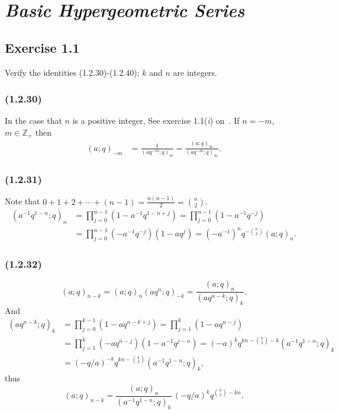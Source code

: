 \clearpage


\section*{\emph{Basic Hypergeometric Series}}\label{sec:bhs}

\subsection*{Exercise 1.1}\label{subsec:1.1}
Verify the identities (1.2.30)-(1.2.40); $k$ and $n$ are integers.

\subsubsection*{(1.2.30)}
In the case that $n$ is a positive integer, See exercise 1.1(\textit{i}) on~.
If $n=-m$, $m\in\mathbb{Z}_+$ then
\begin{align*}
    (a;q)_{-m} &= \frac{1}{(aq^{-m};q)_m} = \frac{(a;q)_\infty}{(aq^{-m};q)_\infty}.
\end{align*}

\subsubsection*{(1.2.31)}
Note that $0+1+2+\cdots+(n-1)=\frac{n(n-1)}{2}=\binom{n}{2}$.
\begin{align*}
    (a^{-1}q^{1-n};q)_n &= \prod_{j=0}^{n-1}(1-a^{-1}q^{1-n+j})=\prod_{j=0}^{n-1}(1-a^{-1}q^{-j})\\
    &= \prod_{j=0}^{n-1}(-a^{-1}q^{-j})(1-aq^{j}) = (-a^{-1})^n q^{-\binom{n}{2}} (a;q)_n.
\end{align*}

\subsubsection*{(1.2.32)}
\[
    (a;q)_{n-k} = (a;q)_n (aq^n;q)_{-k} = \frac{(a;q)_n}{(aq^{n-k};q)_k}.
\]
And
\begin{align*}
    (aq^{n-k};q)_k &= \prod_{j=0}^{k-1} (1-aq^{n-k+j}) = \prod_{j=1}^{k} (1-aq^{n-j}) \\
    &= \prod_{j=1}^{k} (-aq^{n-j})(1-a^{-1}q^{j-n})
    = (-a)^k q^{kn - \binom{k}{2} - k } (a^{-1} q^{1-n};q)_k\\
    &= (-q/a)^{-k} q^{kn - \binom{k}{2}} (a^{-1} q^{1-n};q)_k,
\end{align*}
thus
\[
    (a;q)_{n-k} = \frac{(a;q)_n}{(a^{-1} q^{1-n};q)_k}\,(-q/a)^k q^{\binom{k}{2}-kn}.
\]

